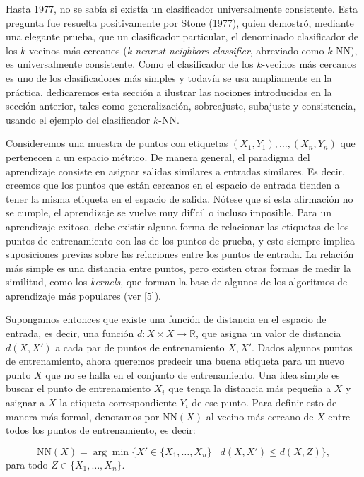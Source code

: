 \documentclass{report}
\begin{document}
Hasta 1977, no se sabía si existía un clasificador universalmente consistente. 
Esta pregunta fue resuelta positivamente por Stone (1977), quien demostró, mediante una elegante prueba, 
que un clasificador particular, el denominado clasificador de los \(k\)-vecinos más cercanos 
(\textit{k-nearest neighbors classifier}, abreviado como $k$-NN), es universalmente consistente. Como el clasificador de los \(k\)-vecinos 
más cercanos es uno de los clasificadores más simples y todavía se usa ampliamente en la práctica, 
dedicaremos esta sección a ilustrar las nociones introducidas en la sección anterior, tales como 
generalización, sobreajuste, subajuste y consistencia, usando el ejemplo del clasificador \(k\)-NN.\newline

Consideremos una muestra de puntos con etiquetas \((X_1, Y_1), \dots, (X_n, Y_n)\) que 
pertenecen a un espacio métrico. De manera general, el paradigma del aprendizaje consiste en asignar salidas 
similares a entradas similares. Es decir, creemos que los puntos que están cercanos en el espacio 
de entrada tienden a tener la misma etiqueta en el espacio de salida. Nótese que si esta afirmación 
no se cumple, el aprendizaje se vuelve muy difícil o incluso imposible. Para un aprendizaje exitoso, 
debe existir alguna forma de relacionar las etiquetas de los puntos de entrenamiento con las de los 
puntos de prueba, y esto siempre implica suposiciones previas sobre las relaciones entre los puntos 
de entrada. La relación más simple es una distancia entre puntos, pero existen otras formas de medir 
la similitud, como los \textit{kernels}, que forman la base de algunos de los algoritmos 
de aprendizaje más populares (ver [5]).\newline

Supongamos entonces que existe una función de distancia en el espacio de entrada, es decir, una función 
\(d : X \times X \to \mathbb{R}\), que asigna un valor de distancia \(d(X, X')\) a cada par de puntos 
de entrenamiento \(X, X'\). Dados algunos puntos de entrenamiento, ahora queremos predecir una buena 
etiqueta para un nuevo punto \(X\) que no se halla en el conjunto de entrenamiento.
 Una idea simple es buscar el punto de entrenamiento \(X_i\) 
que tenga la distancia más pequeña a \(X\) y asignar a \(X\) la etiqueta correspondiente \(Y_i\) de 
ese punto. Para definir esto de manera más formal, denotamos por \(\text{NN}(X)\) al vecino más cercano 
de \(X\) entre todos los puntos de entrenamiento, es decir:

\[
\text{NN}(X) = \arg\min \{X' \in \{X_1, \dots, X_n\} \mid d(X, X') \leq d(X, Z)\}, 
\]
para todo \( Z \in \{X_1, \dots, X_n\} \). \newline
\end{document}
